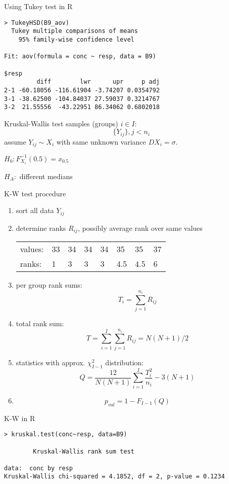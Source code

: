 \documentclass[smaller]{beamer}
\def\xskip{{\vspace{2ex}}}
\begin{document}
\begin{frame}[fragile]{Using Tukey test in R}
\begin{verbatim}
> TukeyHSD(B9_aov)
  Tukey multiple comparisons of means
    95% family-wise confidence level

Fit: aov(formula = conc ~ resp, data = B9)

$resp
         diff        lwr      upr     p adj
2-1 -60.18056 -116.61904 -3.74207 0.0354792
3-1 -38.62500 -104.84037 27.59037 0.3214767
3-2  21.55556  -43.22951 86.34062 0.6802018
\end{verbatim}
 
\end{frame}



\begin{frame}{Kruskal-Wallis test}
samples (groups) $i\in I$:\\
\[
    \{Y_{ij}\}, j< n_i
\]
assume $Y_{ij} \sim X_i$ with same unknown variance $DX_i = \sigma$.

\xskip
$H_0: F_{X_i}^{-1}(0.5) = x_{0.5}$

\xskip
$H_A:$ different medians
\end{frame}

\begin{frame}[fragile]{K-W test procedure}
\begin{enumerate}
 \item sort all data $Y_{ij}$
 \item determine ranks $R_{ij}$, possibly average rank over same values\\
 \begin{tabular}{llllllll}
  values:& 33& 34& 34& 34& 35& 35& 37\\ 
  ranks: & 1 & 3 & 3 & 3 &4.5&4.5& 6
 \end{tabular}
 \item per group rank sums:
 \[
    T_i = \sum_{j=1}^{n_i} R_{ij}
 \]
 \item total rank sum:
 \[
    T = \sum_{i=1}^{I}\sum_{j=1}^{n_i} R_{ij} = N(N+1)/2
 \]
 \item statistics with approx. $\chi^2_{I-1}$ distribution:
 \[
   Q=\frac{12}{N(N+1)} \sum_{i=1}^{I} \frac{T_i^2}{n_i} - 3(N+1)
 \]
 \item 
 \[
   p_{val} = 1 - F_{I-1}(Q)
 \]
\end{enumerate}
\end{frame}

\begin{frame}[fragile]{K-W in R}
\begin{verbatim}
> kruskal.test(conc~resp, data=B9)

        Kruskal-Wallis rank sum test

data:  conc by resp
Kruskal-Wallis chi-squared = 4.1852, df = 2, p-value = 0.1234
\end{verbatim}
\end{frame}
\end{document}
